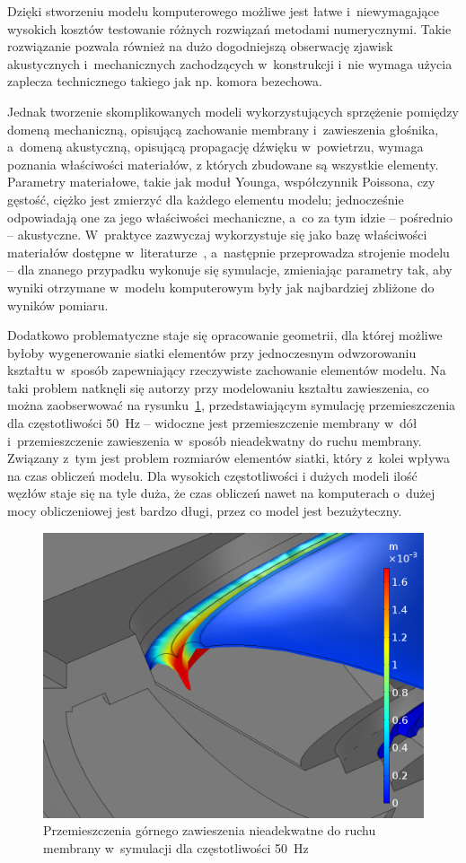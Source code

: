 \documentclass[12pt]{oska}
\begin{document}
	Dzięki stworzeniu modelu komputerowego możliwe jest łatwe i~niewymagające wysokich kosztów testowanie różnych rozwiązań metodami numerycznymi. Takie rozwiązanie pozwala również na dużo dogodniejszą obserwację zjawisk akustycznych i~mechanicznych zachodzących w~konstrukcji i~nie wymaga użycia zaplecza technicznego takiego jak np. komora bezechowa. 
	
	Jednak tworzenie skomplikowanych modeli wykorzystujących sprzężenie pomiędzy domeną mechaniczną, opisującą zachowanie membrany i~zawieszenia głośnika, a~domeną akustyczną, opisującą propagację dźwięku w~powietrzu, wymaga poznania właściwości materiałów, z których zbudowane są wszystkie elementy. Parametry materiałowe, takie jak moduł Younga, współczynnik Poissona, czy gęstość, ciężko jest zmierzyć dla każdego elementu modelu; jednocześnie odpowiadają one za jego właściwości mechaniczne, a~co za tym idzie -- pośrednio -- akustyczne. W~praktyce zazwyczaj wykorzystuje się jako bazę właściwości materiałów dostępne w~literaturze~\cite{modelowanie}, a~następnie przeprowadza strojenie modelu -- dla znanego przypadku wykonuje się symulacje, zmieniając parametry tak, aby wyniki otrzymane w~modelu komputerowym były jak najbardziej zbliżone do wyników pomiaru.
	
	Dodatkowo problematyczne staje się opracowanie geometrii, dla której możliwe byłoby wygenerowanie siatki elementów przy jednoczesnym odwzorowaniu kształtu w~sposób zapewniający rzeczywiste zachowanie elementów modelu. Na taki problem natknęli się autorzy przy modelowaniu kształtu zawieszenia, co można zaobserwować na rysunku~\ref{r:zawieszenie}, przedstawiającym symulację przemieszczenia dla częstotliwości \SI{50}{\hertz} -- widoczne jest przemieszczenie membrany w~dół i~przemieszczenie zawieszenia w~sposób nieadekwatny do ruchu membrany.
	Związany z~tym jest problem rozmiarów elementów siatki, który z~kolei wpływa na czas obliczeń modelu. Dla wysokich częstotliwości i dużych modeli ilość węzłów staje się na tyle duża, że czas obliczeń nawet na komputerach o~dużej mocy obliczeniowej jest bardzo długi, przez co model jest bezużyteczny.
	
	\begin{figure}[!ht]
		\centering
		\includegraphics[width=.7\textwidth]{disp_factor5_f50_02.png}
		\caption{Przemieszczenia górnego zawieszenia nieadekwatne do ruchu membrany w~symulacji dla częstotliwości \SI{50}{\hertz}}
		\label{r:zawieszenie}
	\end{figure}
	
\end{document}
